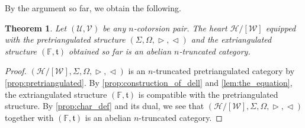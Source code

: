 \documentclass[a4paper,reqno,10pt]{amsart}
\newtheorem{theorem}{Theorem}[subsection]
\theoremstyle{definition}
\theoremstyle{definition}
\theoremstyle{definition}
\theoremstyle{definition}
\theoremstyle{plain}
\newcommand{\ft}{\mathfrak{t}}
\newcommand{\BF}{\mathbb{F}}
\newcommand{\CH}{\mathcal{H}}
\newcommand{\CU}{\mathcal{U}}
\newcommand{\CV}{\mathcal{V}}
\newcommand{\CW}{\mathcal{W}}
\begin{document}
\normalcolor

By the argument so far, we obtain the following.
\begin{theorem}\label{thm:quasitri}
Let $(\CU,\CV)$ be any $n$-cotorsion pair. 
\color{blue}
The heart $\CH/[\CW]$ equipped with the pretriangulated structure $(\Sigma,\Omega,\vartriangleright,\vartriangleleft)$ and the extriangulated structure $(\BF,\ft)$ obtained so far is an abelian $n$-truncated category.
\normalcolor 
\end{theorem}%
\begin{proof}
$(\CH/[\CW],\Sigma,\Omega,\vartriangleright,\vartriangleleft)$ is an $n$-truncated pretriangulated category by \cref{prop:pretriangulated}. 
By \cref{prop:construction_of_dell} and {\color{blue}\cref{lem:the_equation}}, the extriangulated structure $(\BF,\ft)$ is compatible with the pretriangulated structure. 
By \cref{prop:char_def} and its dual, we see that $(\CH/[\CW],\Sigma,\Omega,\vartriangleright,\vartriangleleft)$ together with $(\BF,\ft)$ is an 
\color{blue}
abelian $n$-truncated 
\normalcolor
category.
\end{proof}
\normalcolor
\end{document}
